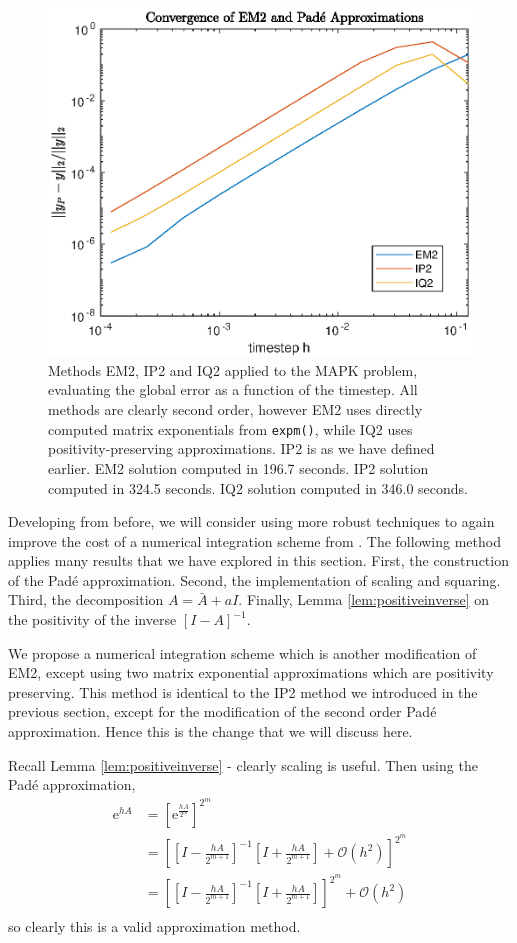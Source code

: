 \begin{figure}
    \centering
    \includegraphics[width=0.75\linewidth]{Matlab/positivemapk2.eps}
    \caption{
        Methods EM2, IP2 and IQ2 applied to the MAPK problem, evaluating the global error as a function of the timestep.
        All methods are clearly second order, however EM2 uses directly computed matrix exponentials from \texttt{expm()},
        while IQ2 uses positivity-preserving approximations.
        IP2 is as we have defined earlier.
        EM2 solution computed in 196.7 seconds.
        IP2 solution computed in 324.5 seconds.
        IQ2 solution computed in 346.0 seconds.
    }
    \label{fig:pademapkpos}
\end{figure}

Developing from before, we will consider using more robust techniques to again improve the cost of a numerical integration scheme from \cite{blanes_pos_2022}.
The following method applies many results that we have explored in this section.
First, the construction of the Pad\'e approximation.
Second, the implementation of scaling and squaring.
Third, the decomposition $A = \bar{A} + a I$.
Finally, Lemma \ref{lem:positiveinverse} on the positivity of the inverse $[I - A]^{-1}$.

We propose a numerical integration scheme which is another modification of EM2, except using two matrix exponential approximations which are positivity preserving.
This method is identical to the IP2 method we introduced in the previous section, except for the modification of the second order Pad\'e approximation.
Hence this is the change that we will discuss here.

Recall Lemma \ref{lem:positiveinverse} - clearly scaling is useful.
Then using the Pad\'e approximation,
\begin{align*}
    \mathrm{e}^{hA} &= \left[ \mathrm{e}^\frac{hA}{2^m} \right]^{2^m} \\
    &= \left[
        \left[ I - \frac{hA}{2^{m+1}} \right]^{-1} \left[ I + \frac{hA}{2^{m+1}} \right] + \mathcal{O}(h^2)
    \right]^{2^m} \\
    &= \left[
        \left[ I - \frac{hA}{2^{m+1}} \right]^{-1} \left[ I + \frac{hA}{2^{m+1}} \right]
    \right]^{2^m} + \mathcal{O}(h^2) \\
\end{align*} 
so clearly this is a valid approximation method.


